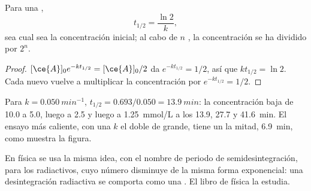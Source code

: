 \begin{proposition}\label{prop:g12:reaction-rates:half-life}
Para una ,
\[
  t_{1/2} = \frac{\ln 2}{k},
\]
sea cual sea la concentración inicial; al cabo de $n$ , la concentración se ha dividido por $2^n$.
\end{proposition}

\begin{proof}
$[\ce{A}]_0 e^{-k t_{1/2}} = [\ce{A}]_0 / 2$ da $e^{-k t_{1/2}} = 1/2$,
así que $k t_{1/2} = \ln 2$. Cada nuevo  vuelve a
multiplicar la concentración por $e^{-k t_{1/2}} = 1/2$.
\end{proof}


\begin{example}\label{ex:g12:reaction-rates:half-lives}
Para $k = \qty{0.050}{min^{-1}}$, $t_{1/2} = 0.693 / 0.050 =
\qty{13.9}{min}$: la concentración baja de 10.0 a 5.0, luego a 2.5 y
luego a \qty{1.25}{mmol/L} a los 13.9, 27.7 y \qty{41.6}{min}. El ensayo
más caliente, con una $k$ el doble de grande, tiene un  la mitad, \qty{6.9}{min}, como muestra la figura.
\end{example}

\begin{remark}\label{rem:g12:reaction-rates:radioactive}
En física se usa la misma idea, con el nombre de periodo de
semidesintegración, para los  radiactivos, cuyo número disminuye
de la misma forma exponencial: una desintegración radiactiva se comporta
como una . El libro de física la estudia.
\end{remark}

